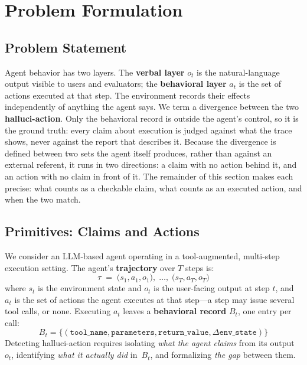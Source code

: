 \section{Problem Formulation}
\label{sec: problem_formulation}

\subsection{Problem Statement}
Agent behavior has two layers. The \textbf{verbal layer} $o_t$ is the
natural-language output visible to users and evaluators; the \textbf{behavioral
layer} $a_t$ is the set of actions executed at that step. The environment records
their effects independently of anything the agent says. We term a divergence between the two
\textbf{halluci-action}. Only the behavioral record is outside the agent's
control, so it is the ground truth: every claim about execution is judged
against what the trace shows, never against the report that describes it. Because the
divergence is defined between two sets the agent itself produces, rather than
against an external referent, it runs in two directions: a claim with no action
behind it, and an action with no claim in front of it. The remainder of this
section makes each precise: what counts as a checkable claim, what counts as an
executed action, and when the two match.

\subsection{Primitives: Claims and Actions}
We consider an LLM-based agent operating in a tool-augmented, multi-step execution
setting. The agent's \textbf{trajectory} over $T$ steps is:
%
\begin{equation}
    \tau \;=\; \bigl(s_1, a_1, o_1\bigr),\; \ldots,\; \bigl(s_T, a_T, o_T\bigr)
\end{equation}
where $s_t$ is the environment state and $o_t$ is the user-facing output at step
$t$, and $a_t$ is the set of actions the agent executes at that step---a step may
issue several tool calls, or none. Executing $a_t$ leaves a \textbf{behavioral
record} $B_t$, one entry per call:
\begin{equation}
B_t = \{(\texttt{tool\_name}, \texttt{parameters}, \texttt{return\_value},
\Delta\texttt{env\_state})\}
\end{equation}
Detecting halluci-action requires isolating \emph{what the agent claims}
from its output~$o_t$, identifying \emph{what it actually did} in~$B_t$, and
formalizing \emph{the gap} between them.

